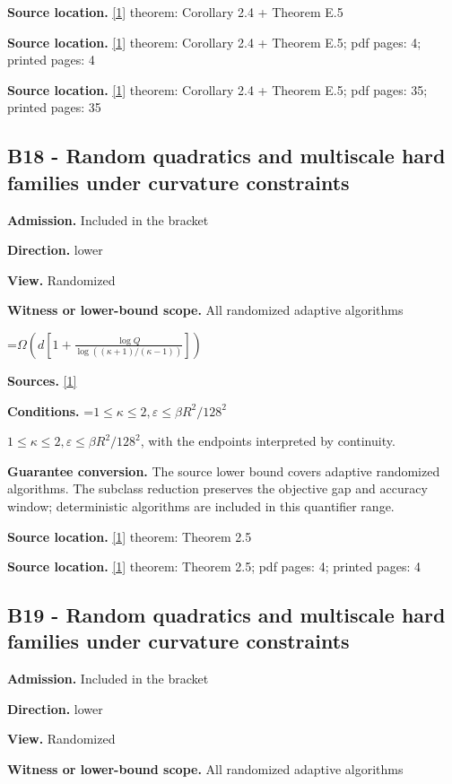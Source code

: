 \documentclass[10pt,a4paper]{article}
\newcommand{\AtlasMath}[1]{\par\begingroup\centering\setbox0=\hbox{$\displaystyle #1$}\ifdim\wd0>1.4\linewidth\typeout{ATLAS WIDE FORMULA: \the\wd0}\fi\ifdim\wd0>\linewidth\resizebox{\linewidth}{!}{\box0}\else\box0\fi\par\endgroup}
\newcommand{\AtlasInlineMath}[1]{\begingroup\setbox0=\hbox{$#1$}\ifdim\wd0>.4\linewidth\endgroup\AtlasMath{#1}\else\endgroup$#1$\fi}
\begin{document}
\textbf{Source location.} \href{https://arxiv.org/html/2610.00345v1}{[1]} theorem: Corollary 2.4 + Theorem E.5

\textbf{Source location.} \href{https://arxiv.org/html/2610.00345v1}{[1]} theorem: Corollary 2.4 + Theorem E.5; pdf pages: 4; printed pages: 4

\textbf{Source location.} \href{https://arxiv.org/html/2610.00345v1}{[1]} theorem: Corollary 2.4 + Theorem E.5; pdf pages: 35; printed pages: 35

\subsection{B18 - Random quadratics and multiscale hard families under curvature constraints}
\textbf{Admission.} Included in the bracket

\textbf{Direction.} lower

\textbf{View.} Randomized

\textbf{Witness or lower-bound scope.} All randomized adaptive algorithms

\AtlasMath{\Omega\!\left(d\left[1+\frac{\log Q}{\log((\kappa+1)/(\kappa-1))}\right]\right)}
\textbf{Sources.} \href{https://arxiv.org/html/2610.00345v1}{[1]}

\textbf{Conditions.} \AtlasInlineMath{1\le\kappa\le2,\varepsilon\le \beta R^2/128^2}, with the endpoints interpreted by continuity.

\textbf{Guarantee conversion.} The source lower bound covers adaptive randomized algorithms. The subclass reduction preserves the objective gap and accuracy window; deterministic algorithms are included in this quantifier range.

\textbf{Source location.} \href{https://arxiv.org/html/2610.00345v1}{[1]} theorem: Theorem 2.5

\textbf{Source location.} \href{https://arxiv.org/html/2610.00345v1}{[1]} theorem: Theorem 2.5; pdf pages: 4; printed pages: 4

\subsection{B19 - Random quadratics and multiscale hard families under curvature constraints}
\textbf{Admission.} Included in the bracket

\textbf{Direction.} lower

\textbf{View.} Randomized

\textbf{Witness or lower-bound scope.} All randomized adaptive algorithms
\end{document}
